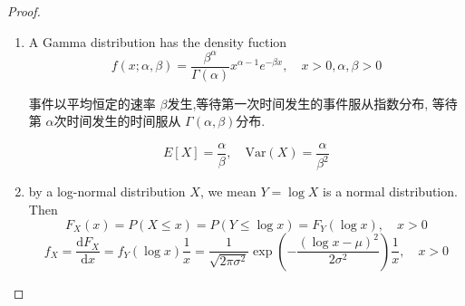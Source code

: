 \documentclass[../main.tex]{subfiles}
\begin{document}
\begin{proof}
\begin{enumerate}
\[\begin{aligned}
          &=   \sigma ^{2} \mathrm{Var}\left( Z\sim \mathcal{N}\left( 0,1 \right)  \right)\\ 
           &=  \sigma ^{2}        
        \end{aligned}
        \] Specifically,  consider \[
        I\left( a \right)= \int_{-\infty}^{\infty}\exp \left( -a\frac{z^{2} }{2 }  \right)\,\mathrm{d} z = \sqrt{\frac{2 \pi }{a } }  
        \] and take differention of \(  a  \).  
        \item A Gamma distribution has the density fuction \[
        f\left( x;\alpha ,\beta  \right)= \frac{\beta ^{\alpha } }{ \Gamma \left(  \alpha  \right)  }x^{\alpha -1}  e^{-\beta x},\quad x> 0, \alpha , \beta > 0
        \]
        \begin{note}
            事件以平均恒定的速率 \(  \beta   \)发生,等待第一次时间发生的事件服从指数分布, 等待第 \(  \alpha   \)次时间发生的时间服从 \(   \Gamma \left( \alpha ,\beta  \right)   \)分布.   
        \end{note}
        \[
        E[X]= \frac{\alpha  }{\beta  } ,\quad \mathrm{Var}\left( X \right)= \frac{ \alpha  }{\beta ^{2} }  
        \]
        \item by a log-normal distribution \(  X  \), we mean \(  Y= \log X  \) is a normal distribution. Then \[
      F_{X}\left( x \right)=   P\left( X\le x \right)= P\left( Y\le \log x \right)= F_{Y}\left( \log x \right)  ,\quad x> 0
        \] \[
        f_{X}=  \frac{\mathrm{d}F_{X}}{\mathrm{d}x}= f_{Y}\left( \log x \right)\frac{1 }{x }  = \frac{1 }{\sqrt{2 \pi  \sigma ^{2}} }\exp \left( - \frac{\left( \log x- \mu  \right)^{2}  }{2 \sigma ^{2} }  \right)  \frac{1 }{x } ,\quad x> 0
        \]
    \end{enumerate}
    
\end{proof}
\end{document}
